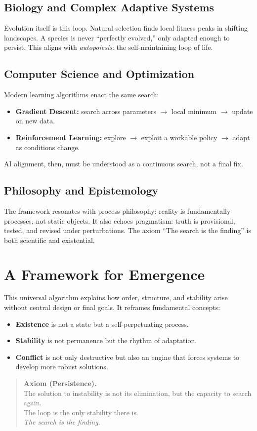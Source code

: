\documentclass[11pt,a4paper]{article}
\begin{document}
\subsection*{Biology and Complex Adaptive Systems}
Evolution itself is this loop. Natural selection finds local fitness peaks in shifting landscapes. A species is never ``perfectly evolved,'' only adapted enough to persist. This aligns with \emph{autopoiesis}: the self-maintaining loop of life.

\subsection*{Computer Science and Optimization}
Modern learning algorithms enact the same search:
\begin{itemize}
  \item \textbf{Gradient Descent:} search across parameters $\rightarrow$ local minimum $\rightarrow$ update on new data.
  \item \textbf{Reinforcement Learning:} explore $\rightarrow$ exploit a workable policy $\rightarrow$ adapt as conditions change.
\end{itemize}
AI alignment, then, must be understood as a continuous search, not a final fix.

\subsection*{Philosophy and Epistemology}
The framework resonates with process philosophy: reality is fundamentally processes, not static objects. It also echoes pragmatism: truth is provisional, tested, and revised under perturbations. The axiom ``The search is the finding'' is both scientific and existential.

\section*{A Framework for Emergence}

This universal algorithm explains how order, structure, and stability arise without central design or final goals. It reframes fundamental concepts:

\begin{itemize}
  \item \textbf{Existence} is not a state but a self-perpetuating process.
  \item \textbf{Stability} is not permanence but the rhythm of adaptation.
  \item \textbf{Conflict} is not only destructive but also an engine that forces systems to develop more robust solutions.
\end{itemize}

\begin{quote}
\textbf{Axiom (Persistence).} \\
The solution to instability is not its elimination, but the capacity to search again. \\
The loop is the only stability there is. \\
\emph{The search is the finding.}
\end{quote}
\end{document}
